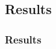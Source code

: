 \documentclass[16:9,en,navbarinfooter]{sdqbeamer}
\begin{document}
\begin{frame}
\section{Results}
\frametitle{Results}

\begin{columns}[t]
    \begin{column}{0.5\textwidth}
    \end{column}
    \begin{column}{0.5\textwidth}
    \end{column}
\end{columns}
\end{frame}


\appendix
\beginbackup{}
\backupend{}
\end{document}
